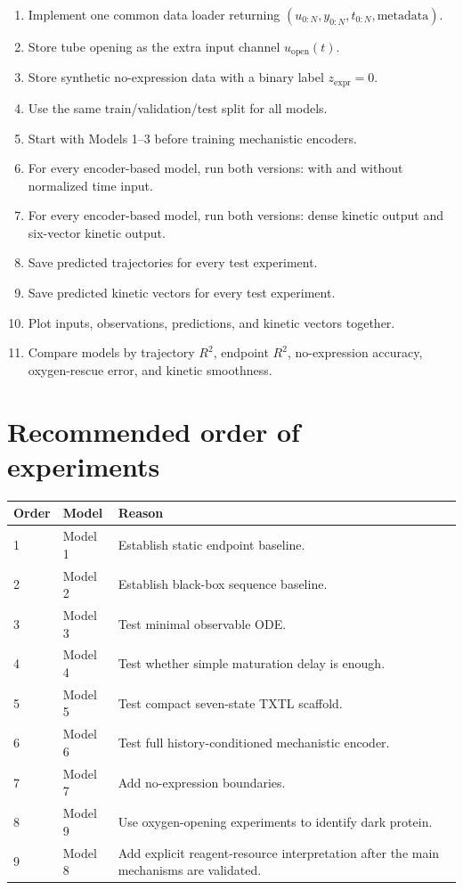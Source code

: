 \documentclass[11pt]{article}
\newcommand{\open}{\mathrm{open}}
\newcommand{\expr}{\mathrm{expr}}
\begin{document}
\begin{enumerate}[leftmargin=*]
    \item Implement one common data loader returning $(u_{0:N},y_{0:N},t_{0:N},\mathrm{metadata})$.
    \item Store tube opening as the extra input channel $u_{\open}(t)$.
    \item Store synthetic no-expression data with a binary label $z_{\expr}=0$.
    \item Use the same train/validation/test split for all models.
    \item Start with Models 1--3 before training mechanistic encoders.
    \item For every encoder-based model, run both versions: with and without normalized time input.
    \item For every encoder-based model, run both versions: dense kinetic output and six-vector kinetic output.
    \item Save predicted trajectories for every test experiment.
    \item Save predicted kinetic vectors for every test experiment.
    \item Plot inputs, observations, predictions, and kinetic vectors together.
    \item Compare models by trajectory $R^2$, endpoint $R^2$, no-expression accuracy, oxygen-rescue error, and kinetic smoothness.
\end{enumerate}

\section{Recommended order of experiments}

\begin{center}
\begin{tabularx}{\textwidth}{llX}
\toprule
Order & Model & Reason \\
\midrule
1 & Model 1 & Establish static endpoint baseline. \\
2 & Model 2 & Establish black-box sequence baseline. \\
3 & Model 3 & Test minimal observable ODE. \\
4 & Model 4 & Test whether simple maturation delay is enough. \\
5 & Model 5 & Test compact seven-state TXTL scaffold. \\
6 & Model 6 & Test full history-conditioned mechanistic encoder. \\
7 & Model 7 & Add no-expression boundaries. \\
8 & Model 9 & Use oxygen-opening experiments to identify dark protein. \\
9 & Model 8 & Add explicit reagent-resource interpretation after the main mechanisms are validated. \\
\bottomrule
\end{tabularx}
\end{center}
\end{document}
